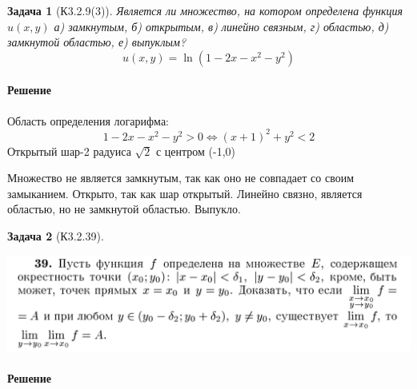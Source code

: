 \documentclass[a4paper,12pt]{report}
\newtheorem{problem}{Задача}[]
\newenvironment{sol}{\paragraph{Решение}}{}
\begin{document}
	
	\newpage
    
    \begin{problem}[К3.2.9(3)]
        Является ли множество, на котором определена функция $u(x,y)$
        а) замкнутым, б) открытым, в) линейно связным,
        г) областью, д) замкнутой областью, е) выпуклым?
        \[
            u(x,y)=\ln (1-2x-x^2-y^2)  
        \]
    \end{problem}
    \begin{sol}
        Область определения логарифма:
        \begin{equation*}
            1-2x-x^2-y^2>0\Leftrightarrow (x+1)^2+y^2<2
        \end{equation*}
        Открытый шар-2 радуиса $\sqrt{2}$ с центром (-1,0)
        \begin{figure}[H]
            \centering
        \end{figure}
        Множество не является замкнутым, так как оно не совпадает со своим замыканием. Открыто, так как шар открытый. Линейно связно, является областью, но не замкнутой областью. Выпукло.
    \end{sol}

    \begin{problem}[К3.2.39]
        \begin{center}
            \includegraphics*[width=1\linewidth]{img/2.39.png}
        \end{center}
    \end{problem}
    \begin{sol}
        
    \end{sol}
\end{document}
